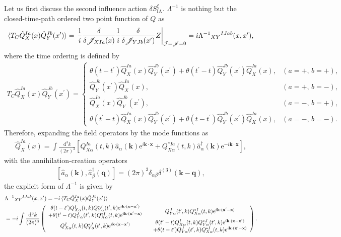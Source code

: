 \documentclass[aps, prd
, preprint
, nofootinbib 
, notitlepage
, longbibliography
]{revtex4-1}
\newcommand{\dd}{\mathrm{d}}
\newcommand{\ee}{\mathrm{e}}
\newcommand{\dk}{\frac{\dd^3k}{(2\pi)^3}}
\newcommand{\dps}{\displaystyle}
\newcommand{\IA}{\mathrm{IA}}
\newcommand{\calJ}{\mathcal{J}}
\newcommand{\scrJ}{\mathscr{J}}
\newcommand{\bae}[1]{\begin{align} #1 \end{align}}
\newcommand{\bce}[1]{\begin{cases} #1 \end{cases}}
\newcommand{\bpme}[1]{\begin{pmatrix} #1 \end{pmatrix}}
\begin{document}
Let us first discuss the second influence action $\delta S_\IA^\xi$.
$\Lambda^{-1}$ is nothing but the closed-time-path ordered two point function of $Q$ as
\bae{
	\braket{T_C\hat{Q}_X^{Ia}(x)\hat{Q}_Y^{Jb}(x^\prime)}=\left.\frac{1}{i}\frac{\delta}{\delta\scrJ_{XIa}(x)}\frac{1}{i}\frac{\delta}{\delta\scrJ_{YJb}(x^\prime)}Z\right|_{\calJ=\scrJ=0}=i\Lambda^{-1}{}_{XY}{}^{IJab}(x,x^\prime),
}
where the time ordering is defined by
\bae{
	T_C\hat{Q}_{X}^{Ia}(x)\hat{Q}_Y^{Jb}(x^\prime)=
	\bce{
		\dps
		\theta(t-t^\prime)\hat{Q}_{X}^{Ia}(x)\hat{Q}_Y^{Jb}(x^\prime)+\theta(t^\prime-t)\hat{Q}_Y^{Jb}(x^\prime)\hat{Q}_X^{Ia}(x), & (a=+,\,b=+), \\
		\dps
		\hat{Q}_Y^{Jb}(x^\prime)\hat{Q}_X^{Ia}(x), & (a=+,\,b=-), \\
		\dps
		\hat{Q}_X^{Ia}(x)\hat{Q}_Y^{Jb}(x^\prime), & (a=-,\,b=+), \\
		\dps
		\theta(t^\prime-t)\hat{Q}_{X}^{Ia}(x)\hat{Q}_Y^{Jb}(x^\prime)+\theta(t-t^\prime)\hat{Q}_Y^{Jb}(x^\prime)\hat{Q}_X^{Ia}(x), & (a=-,\,b=-).
	}
}
Therefore, expanding the field operators by the mode functions as
\bae{\label{eq: mode expansion}
	\hat{Q}_X^{Ia}(x)=\int\dk\left[Q_{X\alpha}^{Ia}(t,k)\hat{a}_\alpha(\mathbf{k})\ee^{i\mathbf{k}\cdot\mathbf{x}}
	+Q_{X\alpha}^{*Ia}(t,k)\hat{a}^\dagger_\alpha(\mathbf{k})\ee^{-i\mathbf{k}\cdot\mathbf{x}}\right],
}
with the annihilation-creation operators
\bae{\label{eq: aadagger}
	[\hat{a}_\alpha(\mathbf{k}),\hat{a}^\dagger_\beta(\mathbf{q})]=(2\pi)^3\delta_{\alpha\beta}\delta^{(3)}(\mathbf{k}-\mathbf{q}),
}
the explicit form of $\Lambda^{-1}$ is given by
\bae{
	&\Lambda^{-1}{}_{XY}{}^{IJab}(x,x^\prime)=-i\braket{T_C\hat{Q}_X^{Ia}(x)\hat{Q}_Y^{Jb}(x^\prime)} \nonumber \\
	&=-i\int\dk\bpme{
		\begin{array}{c}
			\theta(t-t^\prime)Q_{X\alpha}^I(t,k)Q^{*J}_{Y\alpha}(t^\prime,k)\ee^{i\mathbf{k}\cdot(\mathbf{x}-\mathbf{x}^\prime)} \\
			+\theta(t^\prime-t)Q_{Y\alpha}^J(t^\prime,k)Q_{X\alpha}^{*I}(t,k)\ee^{i\mathbf{k}\cdot(\mathbf{x}^\prime-\mathbf{x})}
		\end{array}
		& Q^J_{Y\alpha}(t^\prime,k)Q_{X\alpha}^{*I}(t,k)\ee^{i\mathbf{k}\cdot(\mathbf{x}^\prime-\mathbf{x})} \\
		Q_{X\alpha}^I(t,k)Q^{*J}_{Y\alpha}(t^\prime,k)\ee^{i\mathbf{k}\cdot(\mathbf{x}-\mathbf{x}^\prime)} &
		\begin{array}{c}
			\theta(t^\prime-t)Q_{X\alpha}^I(t,k)Q^{*J}_{Y\alpha}(t^\prime,k)\ee^{i\mathbf{k}\cdot(\mathbf{x}-\mathbf{x}^\prime)} \\
			+\theta(t-t^\prime)Q^J_{Y\alpha}(t^\prime,k)Q_{X\alpha}^{*I}(t,k)\ee^{i\mathbf{k}\cdot(\mathbf{x}^\prime-\mathbf{x})}
		\end{array}
	}.
}
\end{document}
